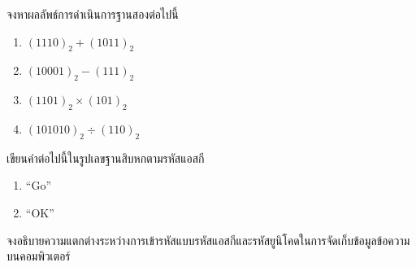 \begin{exercise}
จงหาผลลัพธ์การดำเนินการฐานสองต่อไปนี้
\begin{enumerate}
    \item $(1110)_2 + (1011)_2$
    \item $(10001)_2 - (111)_2$
    \item $(1101)_2 \times (101)_2$
    \item $(101010)_2 \div (110)_2$
\end{enumerate}
\end{exercise}

\begin{exercise}
เขียนคำต่อไปนี้ในรูปเลขฐานสิบหกตามรหัสแอสกี
\begin{enumerate}
    \item ``Go''
    \item ``OK''
\end{enumerate}
\end{exercise}

\begin{exercise}
จงอธิบายความแตกต่างระหว่างการเข้ารหัสแบบรหัสแอสกีและรหัสยูนิโคดในการจัดเก็บข้อมูลข้อความบนคอมพิวเตอร์
\end{exercise}

